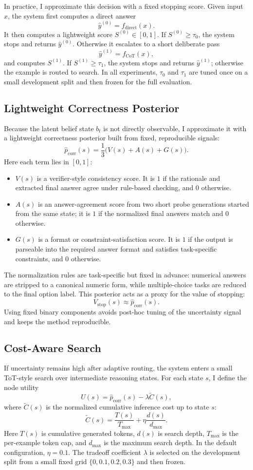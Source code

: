 \documentclass[10pt]{article}
\begin{document}
In practice, I approximate this decision with a fixed stopping score. Given input $x$, the system first computes a direct answer
\[
\hat y^{(0)}=f_{\mathrm{direct}}(x).
\]
It then computes a lightweight score $S^{(0)}\in[0,1]$. If $S^{(0)}\ge \tau_0$, the system stops and returns $\hat y^{(0)}$. Otherwise it escalates to a short deliberate pass
\[
\hat y^{(1)}=f_{\mathrm{CoT}}(x),
\]
and computes $S^{(1)}$. If $S^{(1)}\ge \tau_1$, the system stops and returns $\hat y^{(1)}$; otherwise the example is routed to search. In all experiments, $\tau_0$ and $\tau_1$ are tuned once on a small development split and then frozen for the full evaluation.

\subsection{Lightweight Correctness Posterior}
Because the latent belief state $b_t$ is not directly observable, I approximate it with a lightweight correctness posterior built from fixed, reproducible signals:
\[
\hat p_{\mathrm{corr}}(s)
=
\frac{1}{3}\bigl(V(s)+A(s)+G(s)\bigr).
\]
Here each term lies in $[0,1]$:
\begin{itemize}[leftmargin=1.2em,itemsep=0.08em]
    \item $V(s)$ is a verifier-style consistency score. It is $1$ if the rationale and extracted final answer agree under rule-based checking, and $0$ otherwise.
    \item $A(s)$ is an answer-agreement score from two short probe generations started from the same state; it is $1$ if the normalized final answers match and $0$ otherwise.
    \item $G(s)$ is a format or constraint-satisfaction score. It is $1$ if the output is parseable into the required answer format and satisfies task-specific constraints, and $0$ otherwise.
\end{itemize}
The normalization rules are task-specific but fixed in advance: numerical answers are stripped to a canonical numeric form, while multiple-choice tasks are reduced to the final option label. This posterior acts as a proxy for the value of stopping:
\[
V_{\mathrm{stop}}(s)\approx \hat p_{\mathrm{corr}}(s).
\]
Using fixed binary components avoids post-hoc tuning of the uncertainty signal and keeps the method reproducible.

\subsection{Cost-Aware Search}
If uncertainty remains high after adaptive routing, the system enters a small ToT-style search over intermediate reasoning states. For each state $s$, I define the node utility
\[
U(s)=\hat p_{\mathrm{corr}}(s)-\lambda \widetilde C(s),
\]
where $\widetilde C(s)$ is the normalized cumulative inference cost up to state $s$:
\[
\widetilde C(s)=\frac{T(s)}{T_{\max}}+\eta\frac{d(s)}{d_{\max}}.
\]
Here $T(s)$ is cumulative generated tokens, $d(s)$ is search depth, $T_{\max}$ is the per-example token cap, and $d_{\max}$ is the maximum search depth. In the default configuration, $\eta=0.1$. The tradeoff coefficient $\lambda$ is selected on the development split from a small fixed grid $\{0,0.1,0.2,0.3\}$ and then frozen.
\end{document}
